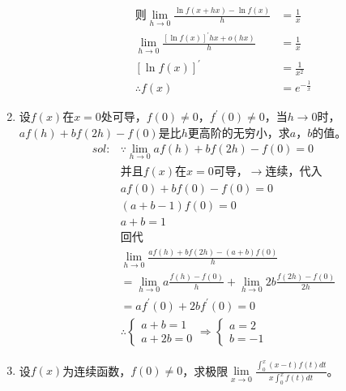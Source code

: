 \begin{enumerate}[{例}1.]
\begin{enumerate}[$1^\circ$]
\begin{align*}
                    \mbox{则}\lim_{h \to 0}\frac{\ln f(x+hx)-\ln f(x)}{h}&=\frac{1}{x}\\
                    \lim_{h \to 0}\frac{[\ln f(x)]^{\prime}hx+o(hx)}{h}&=\frac{1}{x}\\
                    [\ln f(x)]^{\prime}&=\frac{1}{x^2}\\
                    \therefore f(x)&=e^{-\frac{1}{x}}
                \end{align*}
        \end{enumerate}
    \item 设$f(x)$在$x=0$处可导，$f(0)\neq0$，$f^\prime(0)\neq0$，当$h\to0$时，$af(h)+bf(2h)-f(0)$是比$h$更高阶的无穷小，求$a$，$b$的值。
        \begin{align*}
            sol:&\because \lim_{h \to 0} af(h)+bf(2h)-f(0)=0\\
            &\mbox{并且}f(x)\mbox{在}x=0\mbox{可导，}\rightarrow\mbox{连续，代入}\\
            &af(0)+bf(0)-f(0)=0\\
            &(a+b-1)f(0)=0\\
            &a+b=1\\
            &\mbox{回代}\\
            &\lim_{h \to 0}\frac{af(h)+bf(2h)-(a+b)f(0)}{h}\\
            &=\lim_{h \to 0}a\frac{f(h)-f(0)}{h}+\lim_{h \to 0}2b\frac{f(2h)-f(0)}{2h}\\
            &=af^{\prime}(0)+2bf^{\prime}(0)=0\\
            &\therefore
            \begin{cases}
                a+b=1\\
                a+2b=0
            \end{cases}
            \Rightarrow
            \begin{cases}
                a=2\\
                b=-1
            \end{cases}
        \end{align*}
    \item 设$f(x)$为连续函数，$f(0)\neq0$，求极限$\lim\limits_{x\to0}\frac{\int_0^x (x-t)f(t)dt}{x\int_0^xf(t)dt}$。


\end{enumerate}
